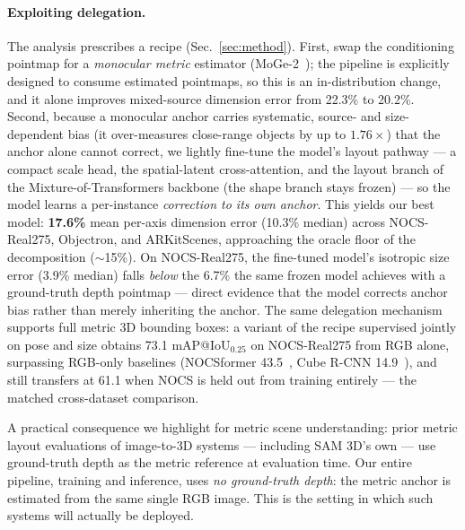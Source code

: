 \documentclass[runningheads]{llncs}
\begin{document}
\paragraph{Exploiting delegation.}
The analysis prescribes a recipe (Sec.~\ref{sec:method}). First, swap the conditioning
pointmap for a \emph{monocular metric} estimator (MoGe-2~\cite{moge2}); the pipeline is
explicitly designed to consume estimated pointmaps, so this is an in-distribution change,
and it alone improves mixed-source dimension error from 22.3\% to 20.2\%. Second, because
a monocular anchor carries systematic, source- and size-dependent bias (\eg it
over-measures close-range objects by up to $1.76\times$) that the anchor alone cannot
correct, we lightly fine-tune the model's layout pathway --- a compact scale head, the
spatial-latent cross-attention, and the layout branch of the Mixture-of-Transformers
backbone (the shape branch stays frozen) --- so the model learns a per-instance
\emph{correction to its own anchor}. This yields our best model: \textbf{17.6\%} mean
per-axis dimension error (10.3\% median) across NOCS-Real275, Objectron, and
ARKitScenes, approaching the oracle floor of the decomposition ($\sim$15\%). On
NOCS-Real275, the fine-tuned model's isotropic size error (3.9\% median) falls
\emph{below} the 6.7\% the same frozen model achieves with a ground-truth depth
pointmap --- direct evidence that the model corrects anchor bias rather than merely
inheriting the anchor. The same delegation mechanism supports full
metric 3D bounding boxes: a variant of the recipe supervised jointly on pose and size
obtains 73.1 mAP@IoU$_{0.25}$ on NOCS-Real275 from RGB alone, surpassing RGB-only
baselines (NOCSformer 43.5~\cite{omninocs}, Cube R-CNN 14.9~\cite{omni3d}), and still
transfers at 61.1 when NOCS is held out from training entirely --- the matched
cross-dataset comparison.

A practical consequence we highlight for metric scene understanding: prior metric layout
evaluations of image-to-3D systems --- including SAM 3D's own --- use ground-truth depth
as the metric reference at evaluation time. Our entire pipeline, training and inference,
uses \emph{no ground-truth depth}: the metric anchor is estimated from the same single
RGB image. This is the setting in which such systems will actually be deployed.
\end{document}
